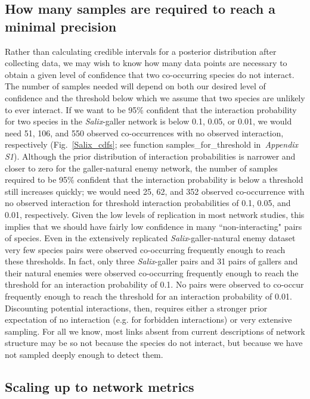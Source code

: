 \documentclass[12pt]{article}
\begin{document}
\begin{spacing}{2.0}
  \subsection*{How many samples are required to reach a minimal precision}

      Rather than calculating credible intervals for a posterior distribution after collecting data, we may wish to know how many data points are necessary to obtain a given level of confidence that two co-occurring species do not interact. The number of samples needed will depend on both our desired level of confidence and the threshold below which we assume that two species are unlikely to ever interact. If we want to be 95\% confident that the interaction probability for two species in the \emph{Salix}-galler network is below 0.1, 0.05, or 0.01, we would need 51, 106, and 550 observed co-occurrences with no observed interaction, respectively (Fig.~\ref{Salix_cdfs}; see function samples\_for\_threshold in~\emph{Appendix S1}). Although the prior distribution of interaction probabilities is narrower and closer to zero for the galler-natural enemy network, the number of samples required to be 95\% confident that the interaction probability is below a threshold still increases quickly; we would need 25, 62, and 352 observed co-occurrence with no observed interaction for threshold interaction probabilities of 0.1, 0.05, and 0.01, respectively. Given the low levels of replication in most network studies, this implies that we should have fairly low confidence in many ``non-interacting" pairs of species. Even in the extensively replicated \emph{Salix}-galler-natural enemy dataset very few species pairs were observed co-occurring frequently enough to reach these thresholds. In fact, only three \emph{Salix}-galler pairs and 31 pairs of gallers and their natural enemies were observed co-occurring frequently enough to reach the threshold for an interaction probability of 0.1. No pairs were observed to co-occur frequently enough to reach the threshold for an interaction probability of 0.01. Discounting potential interactions, then, requires either a stronger prior expectation of no interaction (e.g. for forbidden interactions) or very extensive sampling. For all we know, most links absent from current descriptions of network structure may be so not because the species do not interact, but because we have not sampled deeply enough to detect them.


  \subsection*{Scaling up to network metrics}



\end{spacing}
\end{document}

